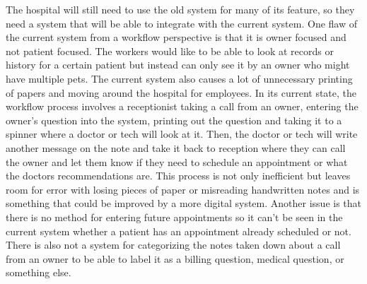 \documentclass[letterpaper,10pt,draftclsnofoot,onecolumn]{article}
\begin{document}
The hospital will still need to use the old system for many of its feature, so they need a system that will be able to integrate with the current system. One flaw of the current system from a workflow perspective is that it is owner focused and not patient focused. The workers would like to be able to look at records or history for a certain patient but instead can only see it by an owner who might have multiple pets. The current system also causes a lot of unnecessary printing of papers and moving around the hospital for employees. In its current state, the workflow process involves a receptionist taking a call from an owner, entering the owner’s question into the system, printing out the question and taking it to a spinner where a doctor or tech will look at it. Then, the doctor or tech will write another message on the note and take it back to reception where they can call the owner and let them know if they need to schedule an appointment or what the doctors recommendations are. This process is not only inefficient but leaves room for error with losing pieces of paper or misreading handwritten notes and is something that could be improved by a more digital system. Another issue is that there is no method for entering future appointments so it can’t be seen in the current system whether a patient has an appointment already scheduled or not. There is also not a system for categorizing the notes taken down about a call from an owner to be able to label it as a billing question, medical question, or something else.
\end{document}
